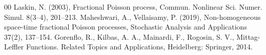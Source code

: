 \documentclass[12pt, twoside, english, headsepline]{article}
\theoremstyle{definition} %
\numberwithin{equation}{section} %
\begin{document}
{\begin{thebibliography}{00}
%
%
%
%
%
Laskin, N. (2003), Fractional Poisson process, Commun. Nonlinear Sci. Numer. Simul. 8(3--4), 201--213.
%
%
Maheshwari, A., Vellaisamy, P. (2019), Non-homogeneous space-time fractional Poisson processes, Stochastic Analysis and Applications 37(2), 137--154.
%
%
Gorenflo, R., Kilbas, A. A., Mainardi, F., Rogosin, S. V., Mittag-Leffler Functions.
Related Topics and Applications, Heidelberg: Springer, 2014.
%
%
%

\end{thebibliography}}
\end{document}
